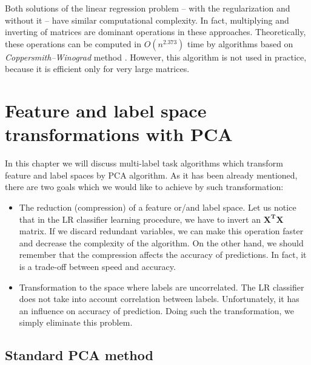 \documentclass[english,a4paper,twoside]{ppfcmthesis}
\begin{document}
Both solutions of the linear regression problem -- with the regularization and without it -- have similar computational complexity. In fact, multiplying and inverting of matrices are dominant operations in these approaches. Theoretically, these operations can be computed in $O(n^{2.373})$ time by algorithms based on \textit{Coppersmith–Winograd} method \citep{VVW}. However, this algorithm is not used in practice, because it is efficient only for very large matrices.

\section{Feature and label space transformations with PCA}

In this chapter we will discuss multi-label task algorithms which transform feature and label spaces by PCA algorithm. As it has been already mentioned, there are two goals which we would like to achieve by such transformation:
\begin{itemize}
    \item The reduction (compression) of a feature or/and label space. Let us notice that in the LR classifier learning procedure, we have to invert an $\boldsymbol{X^T}\boldsymbol{X}$ matrix. If we discard redundant variables, we can make this operation faster and decrease the complexity of the algorithm. On the other hand, we should remember that the compression affects the accuracy of predictions. In fact, it is a trade-off between speed and accuracy.
    \item Transformation to the space where labels are uncorrelated. The LR classifier does not take into account correlation between labels. Unfortunately, it has an influence on accuracy of prediction. Doing such the transformation, we simply eliminate this problem. 
\end{itemize}

\subsection{Standard PCA method}\label{sec:pca}
\end{document}

